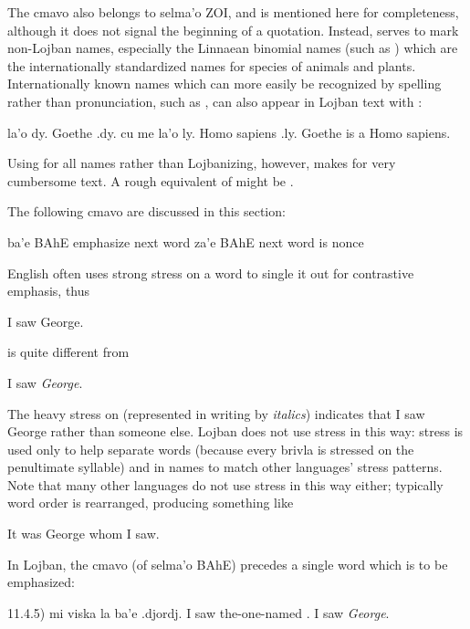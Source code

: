 The cmavo  also belongs to selma'o ZOI, and is
    mentioned here for completeness, although it does not signal
    the beginning of a quotation. Instead,  serves to mark
    non-Lojban names, especially the Linnaean binomial names (such
    as ) which are the internationally standardized
    names for species of animals and plants. Internationally known
    names which can more easily be recognized by spelling rather
    than pronunciation, such as , can also appear in
    Lojban text with :
\begin{example}
la'o dy. Goethe .dy. cu me la'o ly. Homo sapiens .ly.\n
Goethe is a Homo sapiens.
\end{example}

Using  for all names rather than Lojbanizing, however,
    makes for very cumbersome text. A rough equivalent of 
    might be .



The following cmavo are discussed in this section:

   ba'e    BAhE    emphasize next word
    za'e    BAhE    next word is nonce

English often uses strong stress on a word to single it out
    for contrastive emphasis, thus
\begin{example}
I saw George.
\end{example}

{\noindent}is quite different from
\begin{example}
I saw \textit{George}.
\end{example}

The heavy stress on  (represented in
    writing by \textit{italics}) indicates that I saw George rather
    than someone else. Lojban does not use stress in this way:
    stress is used only to help separate words (because every
    brivla is stressed on the penultimate syllable) and in names to
    match other languages' stress patterns. Note that many other
    languages do not use stress in this way either; typically word
    order is rearranged, producing something like
\begin{example}
It was George whom I saw.
\end{example}

In Lojban, the cmavo  (of selma'o BAhE) precedes a
    single word which is to be emphasized: 

\label{html:e11d4.5}
11.4.5)    mi viska la ba'e .djordj.
    I saw the-one-named  .
    I saw \textit{George}.

